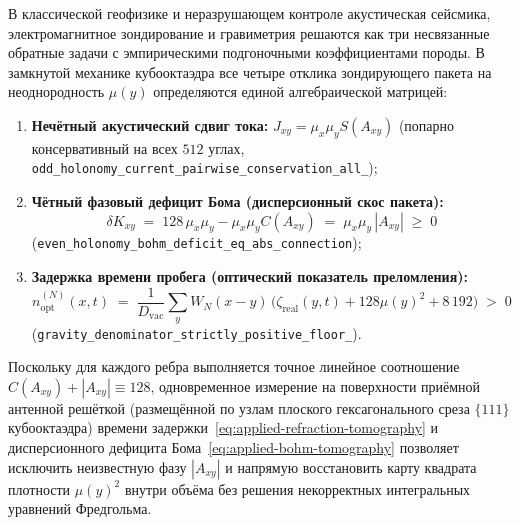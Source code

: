 В классической геофизике и неразрушающем контроле акустическая сейсмика, электромагнитное зондирование и гравиметрия решаются как три несвязанные обратные задачи с эмпирическими подгоночными коэффициентами породы.
В замкнутой механике кубооктаэдра все четыре отклика зондирующего пакета на неоднородность $\mu(y)$ определяются единой алгебраической матрицей:
\begin{enumerate}[leftmargin=*]
\item \textbf{Нечётный акустический сдвиг тока:} $J_{xy} = \mu_x\mu_y S(A_{xy})$ (попарно консервативный на всех $512$ углах, \texttt{odd\_\allowbreak holonomy\_\allowbreak current\_\allowbreak pairwise\_\allowbreak conservation\_\allowbreak all\_});
\item \textbf{Чётный фазовый дефицит Бома (дисперсионный скос пакета):}
  \begin{equation}
  \label{eq:applied-bohm-tomography}
    \delta K_{xy} \;=\; 128\,\mu_x\mu_y - \mu_x\mu_y C(A_{xy}) \;=\; \mu_x\mu_y\,|A_{xy}| \;\ge\; 0
  \end{equation}
  (\texttt{even\_\allowbreak holonomy\_\allowbreak bohm\_\allowbreak deficit\_\allowbreak eq\_\allowbreak abs\_\allowbreak connection});
\item \textbf{Задержка времени пробега (оптический показатель преломления):}
  \begin{equation}
  \label{eq:applied-refraction-tomography}
    n_{\mathrm{opt}}^{(N)}(x,t) \;=\; \frac{1}{D_{\mathrm{vac}}}\sum_{y} W_N(x-y)\,\bigl(\zeta_{\mathrm{real}}(y,t) + 128\mu(y)^2 + 8\,192\bigr) \;>\; 0
  \end{equation}
  (\texttt{gravity\_\allowbreak denominator\_\allowbreak strictly\_\allowbreak positive\_\allowbreak floor\_}).
\end{enumerate}
Поскольку для каждого ребра выполняется точное линейное соотношение $C(A_{xy}) + |A_{xy}| \equiv 128$, одновременное измерение на поверхности приёмной антенной решёткой (размещённой по узлам плоского гексагонального среза $\{111\}$ кубооктаэдра) времени задержки~\eqref{eq:applied-refraction-tomography} и дисперсионного дефицита Бома~\eqref{eq:applied-bohm-tomography} позволяет исключить неизвестную фазу $|A_{xy}|$ и напрямую восстановить карту квадрата плотности $\mu(y)^2$ внутри объёма без решения некорректных интегральных уравнений Фредгольма.

